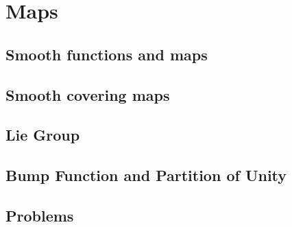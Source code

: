 \chapter{Maps}
\section{Smooth functions and maps}
\section{Smooth covering maps}
\section{Lie Group}
\section{Bump Function and Partition of Unity}
\section{Problems}